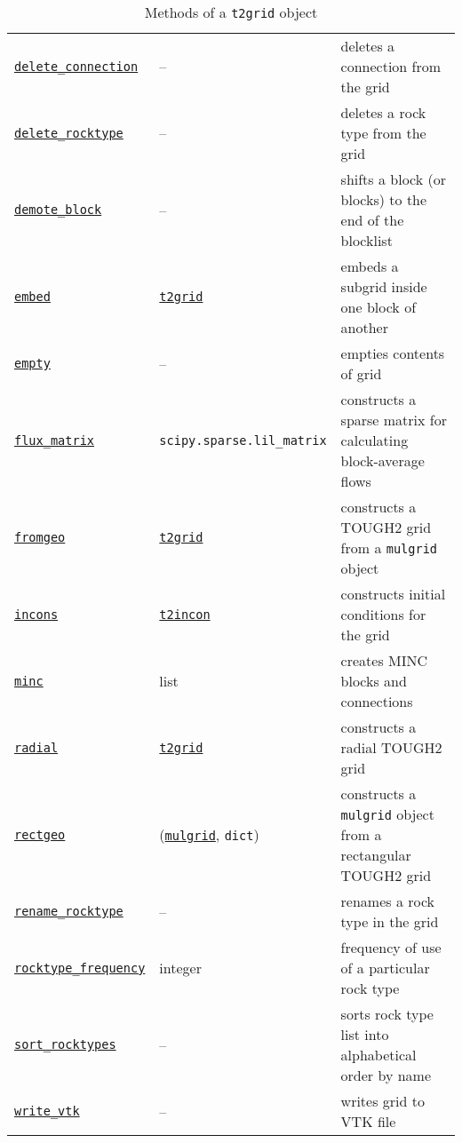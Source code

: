 \begin{table}
\begin{center}
\begin{tabular}{|l|l|p{65mm}|}
      \hyperref[sec:t2grid:delete_connection]{\texttt{delete\_connection}} & -- & deletes a connection from the grid\\
      \hyperref[sec:t2grid:delete_rocktype]{\texttt{delete\_rocktype}} & -- & deletes a rock type from the grid\\
      \hyperref[sec:t2grid:demote_block]{\texttt{demote\_block}} & -- & shifts a block (or blocks) to the end of the blocklist\\
      \hyperref[sec:t2grid:embed]{\texttt{embed}} & \hyperref[t2grids]{\texttt{t2grid}} & embeds a subgrid inside one block of another \\
      \hyperref[sec:t2grid:empty]{\texttt{empty}} & -- & empties contents of grid\\
      \hyperref[sec:t2grid:flux_matrix]{\texttt{flux\_matrix}} & \texttt{scipy.sparse.lil\_matrix} & constructs a sparse matrix for calculating block-average flows \\
      \hyperref[sec:t2grid:fromgeo]{\texttt{fromgeo}} & \hyperref[t2grids]{\texttt{t2grid}} & constructs a TOUGH2 grid from a \texttt{mulgrid} object\\
      \hyperref[sec:t2grid:incons]{\texttt{incons}} & \hyperref[incons]{\texttt{t2incon}} & constructs initial conditions for the grid\\
      \hyperref[sec:t2grid:MINC]{\texttt{minc}} & list & creates MINC blocks and connections\\
      \hyperref[sec:t2grid:radial]{\texttt{radial}} & \hyperref[t2grids]{\texttt{t2grid}} & constructs a radial TOUGH2 grid\\
      \hyperref[sec:t2grid:rectgeo]{\texttt{rectgeo}} & (\hyperref[mulgrids]{\texttt{mulgrid}}, \texttt{dict}) & constructs a \texttt{mulgrid} object from a rectangular TOUGH2 grid\\
      \hyperref[sec:t2grid:rename_rocktype]{\texttt{rename\_rocktype}} & -- & renames a rock type in the grid\\
      \hyperref[sec:t2grid:rocktype_frequency]{\texttt{rocktype\_frequency}} & integer & frequency of use of a particular rock type\\
      \hyperref[sec:t2grid:sort_rocktypes]{\texttt{sort\_rocktypes}} & -- & sorts rock type list into alphabetical order by name\\
      \hyperref[sec:t2grid:write_vtk]{\texttt{write\_vtk}} & -- & writes grid to VTK file\\
      \hline
    \end{tabular}
    \caption{Methods of a \texttt{t2grid} object}
    \label{tb:t2grid_methods}
  \end{center}
\end{table}

